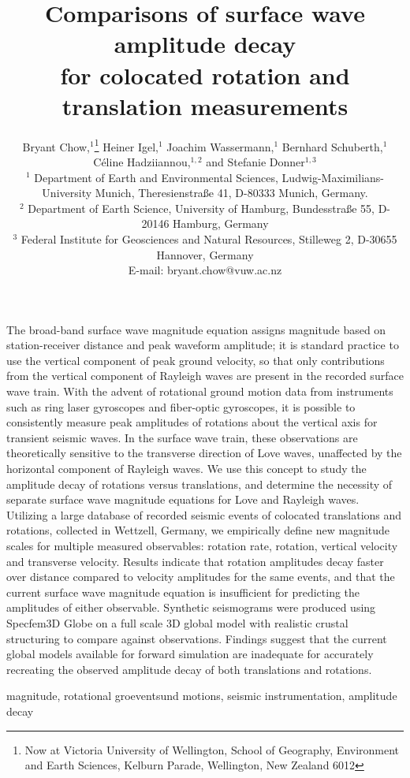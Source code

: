 \documentclass{gji}
\title[Comparisons of surface wave amplitude decay]
  {Comparisons of surface wave amplitude decay \\for colocated rotation and translation measurements}
\author[Bryant Chow]
  {Bryant Chow,$^1$\thanks{Now at Victoria University of Wellington, School of Geography, Environment and Earth Sciences, Kelburn Parade, Wellington, New Zealand 6012} 
  Heiner Igel,$^1$ 
  Joachim Wassermann,$^1$
  Bernhard Schuberth,$^1$  \vspace{2mm}\\
  \LARGE{{\normalfont C\' eline Hadziiannou,$^{1,2}$ and
  Stefanie Donner$^{1,3}$}}\vspace{2mm}\\
  $^1$ Department of Earth and Environmental Sciences, Ludwig-Maximilians-University Munich, Theresienstra\ss e 41, D-80333 Munich, Germany.\\
  $^2$ Department of Earth Science, University of Hamburg, Bundesstra\ss e 55, D-20146 Hamburg, Germany\\
  $^3$ Federal Institute for Geosciences and Natural Resources, Stilleweg 2, D-30655 Hannover, Germany \\E-mail: bryant.chow@vuw.ac.nz
  }
\date{}
\begin{document}
\label{firstpage}

\maketitle

\begin{summary}
The broad-band surface wave magnitude equation assigns magnitude based on station-receiver distance and peak waveform amplitude; it is standard practice to use the vertical component of peak ground velocity, so that only contributions from the vertical component of Rayleigh waves are present in the recorded surface wave train. With the advent of rotational ground motion data from instruments such as ring laser gyroscopes and fiber-optic gyroscopes, it is possible to consistently measure peak amplitudes of rotations about the vertical axis for transient seismic waves. In the surface wave train, these observations are theoretically sensitive to the transverse direction of Love waves, unaffected by the horizontal component of Rayleigh waves. We use this concept to study the amplitude decay of rotations versus translations, and determine the necessity of separate surface wave magnitude equations for Love and Rayleigh waves. Utilizing a large database of recorded seismic events of colocated translations and rotations, collected in Wettzell, Germany, we empirically define new magnitude scales for multiple measured observables: rotation rate, rotation, vertical velocity and transverse velocity. Results indicate that rotation amplitudes decay faster over distance compared to velocity amplitudes for the same events, and that the current surface wave magnitude equation is insufficient for predicting the amplitudes of either observable. Synthetic seismograms were produced using Specfem3D Globe on a full scale 3D global model with realistic crustal structuring to compare against observations. Findings suggest that the current global models available for forward simulation are inadequate for accurately recreating the observed amplitude decay of both translations and rotations.
\end{summary}

\begin{keywords}
magnitude, rotational groeventsund motions, seismic instrumentation, amplitude decay
\end{keywords}
\end{document}
